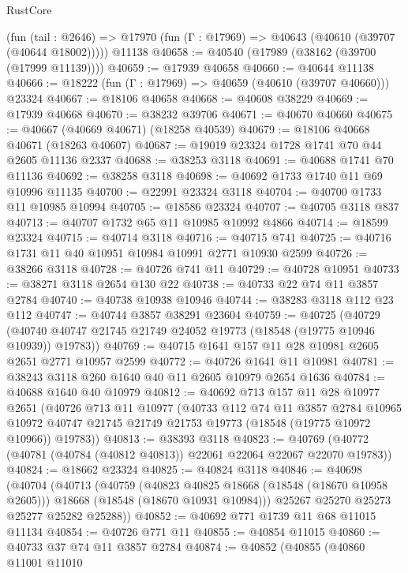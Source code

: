 \begin{lexlean}{RustCore}
\begin{coremodule}
    (fun (tail : @2646) => @17970 (fun (Γ : @17969) => @40643 (@40610 (@39707 (@40644 @18002)))))
    @11138
@40658 := @40540 (@17989 (@38162 (@39700 (@17999 @11139))))
@40659 := @17939 @40658
@40660 := @40644 @11138
@40666 := @18222 (fun (Γ : @17969) => @40659 (@40610 (@39707 @40660))) @23324
@40667 := @18106 @40658
@40668 := @40608 @38229
@40669 := @17939 @40668
@40670 := @38232 @39706
@40671 := @40670 @40660
@40675 := @40667 (@40669 @40671) (@18258 @40539)
@40679 := @18106 @40668 @40671 (@18263 @40607)
@40687 := @19019 @23324 @1728 @1741 @70 @44 @2605 @11136 @2337
@40688 := @38253 @3118
@40691 := @40688 @1741 @70 @11136
@40692 := @38258 @3118
@40698 := @40692 @1733 @1740 @11 @69 @10996 @11135
@40700 := @22991 @23324 @3118
@40704 := @40700 @1733 @11 @10985 @10994
@40705 := @18586 @23324
@40707 := @40705 @3118 @837
@40713 := @40707 @1732 @65 @11 @10985 @10992 @4866
@40714 := @18599 @23324
@40715 := @40714 @3118
@40716 := @40715 @741
@40725 := @40716 @1731 @11 @40 @10951 @10984 @10991 @2771 @10930 @2599
@40726 := @38266 @3118
@40728 := @40726 @741 @11
@40729 := @40728 @10951
@40733 := @38271 @3118 @2654 @130 @22
@40738 := @40733 @22 @74 @11 @3857 @2784
@40740 := @40738 @10938 @10946
@40744 := @38283 @3118 @112 @23 @112
@40747 := @40744 @3857 @38291 @23604
@40759 := @40725
    (@40729 (@40740 @40747 @21745 @21749 @24052 @19773 (@18548 (@19775 @10946 @10939)) @19783))
@40769 := @40715 @1641 @157 @11 @28 @10981 @2605 @2651 @2771 @10957 @2599
@40772 := @40726 @1641 @11 @10981
@40781 := @38243 @3118 @260 @1640 @40 @11 @2605 @10979 @2654 @1636
@40784 := @40688 @1640 @40 @10979
@40812 := @40692
    @713
    @157
    @11
    @28
    @10977
    @2651
    (@40726
      @713
      @11
      @10977
      (@40733
        @112
        @74
        @11
        @3857
        @2784
        @10965
        @10972
        @40747
        @21745
        @21749
        @21753
        @19773
        (@18548 (@19775 @10972 @10966))
        @19783))
@40813 := @38393 @3118
@40823 := @40769 (@40772 (@40781 (@40784 (@40812 @40813)) @22061 @22064 @22067 @22070 @19783))
@40824 := @18662 @23324
@40825 := @40824 @3118
@40846 := @40698
    (@40704
      (@40713
        (@40759
          (@40823 @40825 @18668 (@18548 (@18670 @10958 @2605)))
          @18668
          (@18548 (@18670 @10931 @10984)))
        @25267
        @25270
        @25273
        @25277
        @25282
        @25288))
@40852 := @40692 @771 @1739 @11 @68 @11015 @11134
@40854 := @40726 @771 @11
@40855 := @40854 @11015
@40860 := @40733 @37 @74 @11 @3857 @2784
@40874 := @40852
    (@40855
      (@40860
        @11001
        @11010

\end{coremodule}
\end{lexlean}
